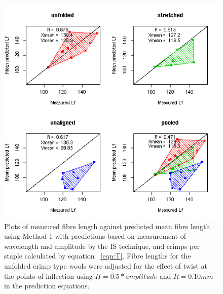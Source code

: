 %

\begin{figure}[!h]
  \centering
  \includegraphics[width=1.1\textwidth]{figispredlftc.png}
  \caption{Plots of measured fibre length against predicted mean fibre length using Method 1 with predictions based on measurement of wavelength and amplitude by the IS technique, and crimps per staple calculated by equation ~\ref{eqn:T}. Fibre lengths for the unfolded crimp type wools were adjusted for the effect of twist at the points of inflection using $H = 0.5 * amplitude$ and $R = 0.10 mm$ in the prediction equations.}
  \label{fig:ispredlftc}
\end{figure}

%

